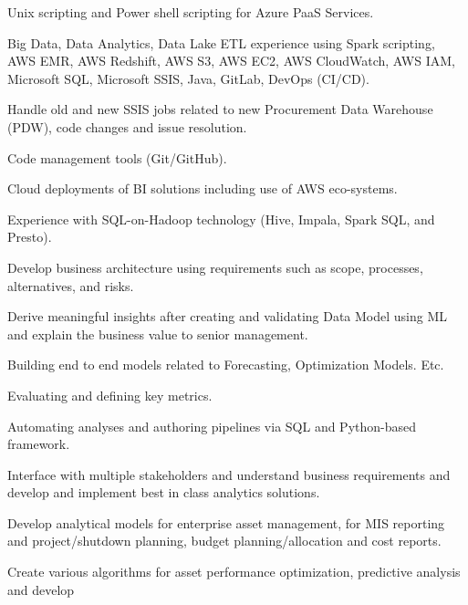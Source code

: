 \documentclass[]{deedy-resume-openfont}
\begin{document}
\begin{minipage}[t]{1\textwidth} 
\begin{tightemize}
\item Unix scripting and Power shell scripting for Azure PaaS Services.
\end{tightemize}
\vspace{\topsep}
\sectionsep
\begin{tightemize}
\item Big Data, Data Analytics, Data Lake ETL experience using Spark scripting, AWS EMR, AWS Redshift,
AWS S3, AWS EC2, AWS CloudWatch, AWS IAM, Microsoft SQL, Microsoft SSIS, Java, GitLab,
DevOps (CI/CD).
\item Handle old and new SSIS jobs related to new Procurement Data Warehouse (PDW), code changes and
issue resolution.
\item Code management tools (Git/GitHub).
\item Cloud deployments of BI solutions including use of AWS eco-systems.
\item Experience with SQL-on-Hadoop technology (Hive, Impala, Spark SQL, and Presto).
\end{tightemize}
\vspace{\topsep}
\sectionsep
\begin{tightemize}
\item Develop business architecture using requirements such as scope, processes, alternatives, and risks.
\item Derive meaningful insights after creating and validating Data Model using ML and explain the
business value to senior management.
\item Building end to end models related to Forecasting, Optimization Models. Etc.
\item Evaluating and defining key metrics.
\item Automating analyses and authoring pipelines via SQL and Python-based framework.
\item Interface with multiple stakeholders and understand business requirements and develop and
implement best in class analytics solutions.
\item Develop analytical models for enterprise asset management, for MIS reporting and project/shutdown planning, budget planning/allocation and cost reports.
\item Create various algorithms for asset performance optimization, predictive analysis and develop

\end{tightemize}
\end{minipage}
\end{document}
